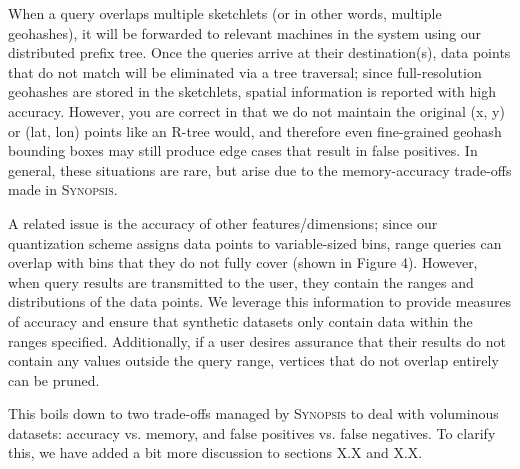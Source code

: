 \documentclass{article}
\begin{document}
\begin{tcolorbox}
    When a query overlaps multiple sketchlets (or in other words, multiple geohashes), it will be forwarded to relevant machines in the system using our distributed prefix tree. Once the queries arrive at their destination(s), data points that do not match will be eliminated via a tree traversal; since full-resolution geohashes are stored in the sketchlets, spatial information is reported with high accuracy. However, you are correct in that we do not maintain the original (x, y) or (lat, lon) points like an R-tree would, and therefore even fine-grained geohash bounding boxes may still produce edge cases that result in false positives. In general, these situations are rare, but arise due to the memory-accuracy trade-offs made in \textsc{Synopsis}.

    A related issue is the accuracy of other features/dimensions; since our quantization scheme assigns data points to variable-sized bins, range queries can overlap with bins that they do not fully cover (shown in Figure 4). However, when query results are transmitted to the user, they contain the ranges and distributions of the data points. We leverage this information to provide measures of accuracy and ensure that synthetic datasets only contain data within the ranges specified. Additionally, if a user desires assurance that their results do not contain any values outside the query range, vertices that do not overlap entirely can be pruned.

    This boils down to two trade-offs managed by \textsc{Synopsis} to deal with voluminous datasets: accuracy vs. memory, and false positives vs. false negatives. To clarify this, we have added a bit more discussion to sections X.X and X.X.
\end{tcolorbox}
\end{document}
